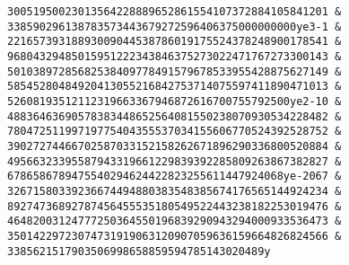 \begin{verbatim}
30051950023013564228889652861554107372884105841201 &
338590296138783573443679272596406375000000000ye3-1 &
22165739318893009044538786019175524378248900178541 &
96804329485015951222343846375273022471767273300143 &
50103897285682538409778491579678533955428875627149 &
58545280484920413055216842753714075597411890471013 &
52608193512112319663367946872616700755792500ye2-10 &
48836463690578383448652564081550238070930534228482 &
78047251199719775404355537034155606770524392528752 &
39027274466702587033152158262671896290336800520884 &
49566323395587943319661229839392285809263867382827 &
6786586789475540294624422823255611447924068ye-2067 &
32671580339236674494880383548385674176565144924234 &
89274736892787456455535180549522443238182253019476 &
46482003124777250364550196839290943294000933536473 &
35014229723074731919063120907059636159664826824566 &
3385621517903506998658859594785143020489y 
\end{verbatim} 

